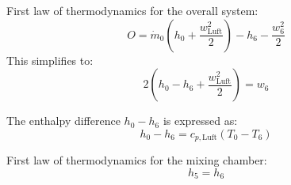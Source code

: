 First law of thermodynamics for the overall system:  
\[ O = \dot{m}_0 \left( h_0 + \frac{w_{\text{Luft}}^2}{2} \right) - h_6 - \frac{w_6^2}{2} \]  
This simplifies to:  
\[ 2 \left( h_0 - h_6 + \frac{w_{\text{Luft}}^2}{2} \right) = w_6 \]  

The enthalpy difference \( h_0 - h_6 \) is expressed as:  
\[ h_0 - h_6 = c_{p,\text{Luft}} \left( T_0 - T_6 \right) \]  

First law of thermodynamics for the mixing chamber:  
\[ h_5 = h_6 \]